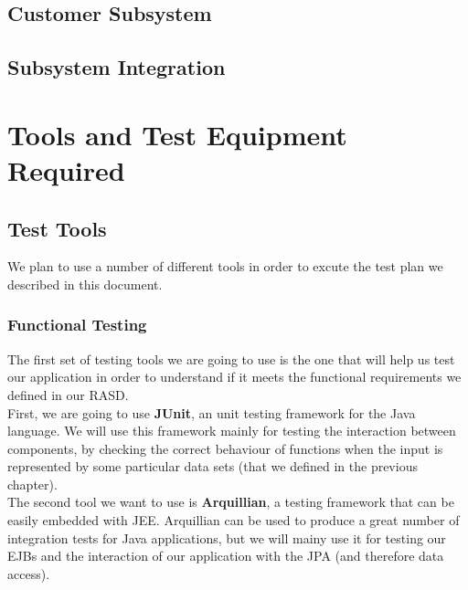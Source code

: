 \documentclass{article}
\begin{document}
\newpage
\subsection{Customer Subsystem}







\subsection{Subsystem Integration}

\newpage

\section{Tools and Test Equipment Required}
\subsection{Test Tools}
We plan to use a number of different tools in order to excute the test plan we described in this document.
\subsubsection{Functional Testing}
The first set of testing tools we are going to use is the one that will help us test our application in order to understand  if it meets the functional requirements we defined in our RASD.
\\

First, we are going to use \textbf{JUnit}, an unit testing framework for the Java language. We will use this framework mainly for testing the interaction between components, by checking the correct behaviour of functions when the input is represented by some particular data sets (that we defined in the previous chapter).
\\

The second tool we want to use is \textbf{Arquillian}, a testing framework that can be easily embedded with JEE. Arquillian can be used to produce a great number of integration tests for Java applications, but we will mainy use it for testing our EJBs and the interaction of our application with the JPA (and therefore data access).
\end{document}
